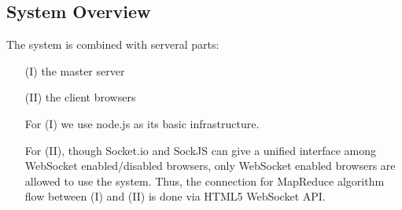 \subsection{System Overview}

The system is combined with serveral parts:

\begin{enumerate}

\item[(I)] the master server

\item[(II)] the client browsers


For (I) we use node.js as its basic infrastructure.

For (II), though Socket.io and SockJS can give a unified interface among WebSocket enabled/disabled browsers, only WebSocket enabled browsers are allowed to use the system.
Thus, the connection for MapReduce algorithm flow between (I) and (II) is done via HTML5 WebSocket API.

\end{enumerate}
